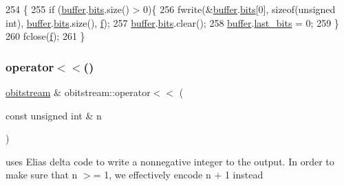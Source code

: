 \begin{DoxyCode}
254                       \{
255   \textcolor{keywordflow}{if} (\hyperlink{classobitstream_aeaccad00a395a404aa16472bfa052be3}{buffer}.\hyperlink{classbit__pipe_a86f38af1e9736b053728033490476b50}{bits}.size() > 0)\{
256     fwrite(&\hyperlink{classobitstream_aeaccad00a395a404aa16472bfa052be3}{buffer}.\hyperlink{classbit__pipe_a86f38af1e9736b053728033490476b50}{bits}[0], \textcolor{keyword}{sizeof}(\textcolor{keywordtype}{unsigned} \textcolor{keywordtype}{int}), \hyperlink{classobitstream_aeaccad00a395a404aa16472bfa052be3}{buffer}.\hyperlink{classbit__pipe_a86f38af1e9736b053728033490476b50}{bits}.size(), 
      \hyperlink{classobitstream_ac589d74745217748c888ae777ab324a7}{f});
257     \hyperlink{classobitstream_aeaccad00a395a404aa16472bfa052be3}{buffer}.\hyperlink{classbit__pipe_a86f38af1e9736b053728033490476b50}{bits}.clear();
258     \hyperlink{classobitstream_aeaccad00a395a404aa16472bfa052be3}{buffer}.\hyperlink{classbit__pipe_a0f3e84b02751803adaab499b5dad86fe}{last\_bits} = 0;
259   \}
260   fclose(\hyperlink{classobitstream_ac589d74745217748c888ae777ab324a7}{f});
261 \}
\end{DoxyCode}
\mbox{\label{classobitstream_a09352e38c7d1d5bcff438c0b8ba41ff4}} 
\subsubsection{\texorpdfstring{operator$<$$<$()}{operator<<()}\hspace{0.1cm}{\footnotesize\ttfamily [1/2]}}
{\footnotesize\ttfamily \hyperlink{classobitstream}{obitstream} \& obitstream\+::operator$<$$<$ (\begin{DoxyParamCaption}\item[{const unsigned int \&}]{n }\end{DoxyParamCaption})}



uses Elias delta code to write a nonnegative integer to the output. In order to make sure that n $>$= 1, we effectively encode n + 1 instead 


